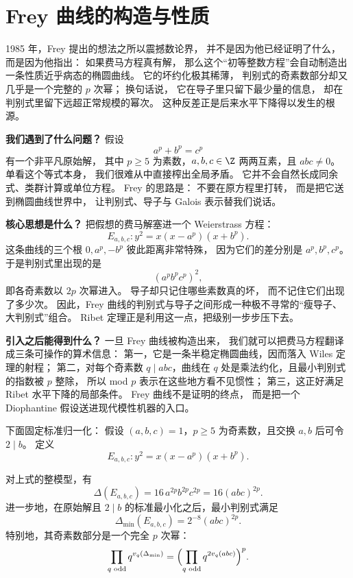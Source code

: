 \section{Frey 曲线的构造与性质}
\label{sec:ch10-frey}

\providecommand{\rhobar}{\bar{\rho}}

1985 年，Frey 提出的想法之所以震撼数论界，
并不是因为他已经证明了什么，
而是因为他指出：
如果费马方程真有解，
那么这个“初等整数方程”会自动制造出一条性质近乎病态的椭圆曲线。
它的坏约化极其稀薄，
判别式的奇素数部分却又几乎是一个完整的 $p$ 次幂；
换句话说，
它在导子里只留下最少量的信息，
却在判别式里留下远超正常规模的幂次。
这种反差正是后来水平下降得以发生的根源。

\textbf{我们遇到了什么问题？}
假设
\[
  a^p+b^p=c^p
\]
有一个非平凡原始解，
其中 $p\ge 5$ 为素数，$a,b,c\in\Z$ 两两互素，且 $abc\neq 0$。
单看这个等式本身，
我们很难从中直接榨出全局矛盾。
它并不会自然长成同余式、类群计算或单位方程。
Frey 的思路是：
不要在原方程里打转，
而是把它送到椭圆曲线世界中，
让判别式、导子与 Galois 表示替我们说话。

\textbf{核心思想是什么？}
把假想的费马解塞进一个 Weierstrass 方程：
\[
  E_{a,b,c}\colon y^2=x(x-a^p)(x+b^p).
\]
这条曲线的三个根 $0,a^p,-b^p$ 彼此距离非常特殊，
因为它们的差分别是 $a^p,b^p,c^p$。
于是判别式里出现的是
\[
  (a^pb^pc^p)^2,
\]
即各奇素数以 $2p$ 次幂进入。
导子却只记住哪些素数真的坏，
而不记住它们出现了多少次。
因此，Frey 曲线的判别式与导子之间形成一种极不寻常的“瘦导子、大判别式”组合。
Ribet 定理正是利用这一点，把级别一步步压下去。

\textbf{引入之后能得到什么？}
一旦 Frey 曲线被构造出来，
我们就可以把费马方程翻译成三条可操作的算术信息：
第一，它是一条半稳定椭圆曲线，因而落入 Wiles 定理的射程；
第二，对每个奇素数 $q\mid abc$，曲线在 $q$ 处是乘法约化，且最小判别式的指数被 $p$ 整除，
所以 mod $p$ 表示在这些地方看不见惯性；
第三，这正好满足 Ribet 水平下降的局部条件。
Frey 曲线不是证明的终点，
而是把一个 Diophantine 假设送进现代模性机器的入口。



下面固定标准归一化：
假设 $(a,b,c)=1$，$p\ge 5$ 为奇素数，且交换 $a,b$ 后可令 $2\mid b$。
定义
\[
  E_{a,b,c}\colon y^2=x(x-a^p)(x+b^p).
\]

\begin{proposition}
\label{prop:ch10-frey-discriminant}
对上式的整模型，有
\[
  \Delta(E_{a,b,c})=16\,a^{2p}b^{2p}c^{2p}=16(abc)^{2p}.
\]
进一步地，在原始解且 $2\mid b$ 的标准最小化之后，最小判别式满足
\[
  \Delta_{\min}(E_{a,b,c})=2^{-8}(abc)^{2p}.
\]
特别地，其奇素数部分是一个完全 $p$ 次幂：
\[
  \prod_{q\text{ odd}} q^{v_q(\Delta_{\min})}
  =\Bigl(\prod_{q\text{ odd}} q^{2v_q(abc)}\Bigr)^p.
\]
\end{proposition}

